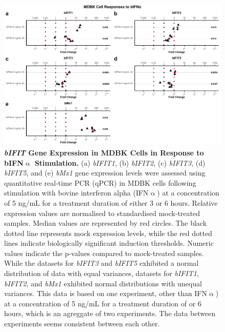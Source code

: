 \begin{figure}
    \centering
    \includegraphics[width=1\linewidth]{07. Chapter 2/Figs/02. Induction/01. mdbk_treat_bifna.pdf}
    \caption[\textit{bIFIT} Gene Expression in MDBK Cells in Response to bIFN$\upalpha$ Stimulation.]{\textbf{\textit{bIFIT} Gene Expression in MDBK Cells in Response to bIFN$\upalpha$ Stimulation.} (a) \textit{bIFIT1}, (b) \textit{bIFIT2}, (c) \textit{bIFIT3}, (d) \textit{bIFIT5}, and (e) \textit{bMx1} gene expression levels were assessed using quantitative real-time PCR (qPCR) in MDBK cells following stimulation with bovine interferon alpha (IFN$\upalpha$) at a concentration of 5 ng/mL for a treatment duration of either 3 or 6 hours. Relative expression values are normalised to standardised mock-treated samples. Median values are represented by red circles. The black dotted line represents mock expression levels, while the red dotted lines indicate biologically significant induction thresholds. Numeric values indicate the p-values compared to mock-treated samples. While the datasets for \textit{bIFIT3} and \textit{bIFIT5} exhibited a normal distribution of data with equal variances, datasets for \textit{bIFIT1}, \textit{bIFIT2}, and \textit{bMx1} exhibited normal distributions with unequal variances. This data is based on one experiment, other than IFN$\upalpha$) at a concentration of 5 ng/mL for a treatment duration of or 6 hours, which is an agreggate of two experiments. The data between experiments seems consistent between each other.}
    \label{fig:MDBK responses to bIFNa}
\end{figure}

